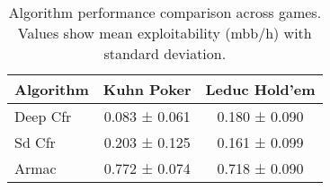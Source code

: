 \begin{table}[h]
\centering
\caption{Algorithm performance comparison across games. Values show mean exploitability (mbb/h) with standard deviation.}
\label{tab:performance_comparison}
\begin{tabular}{lcc}
\toprule
Algorithm & Kuhn Poker & Leduc Hold'em \\
\midrule
Deep Cfr & 0.083 ± 0.061 & 0.180 ± 0.090 \\
Sd Cfr & 0.203 ± 0.125 & 0.161 ± 0.099 \\
Armac & 0.772 ± 0.074 & 0.718 ± 0.090 \\
\bottomrule
\end{tabular}
\end{table}